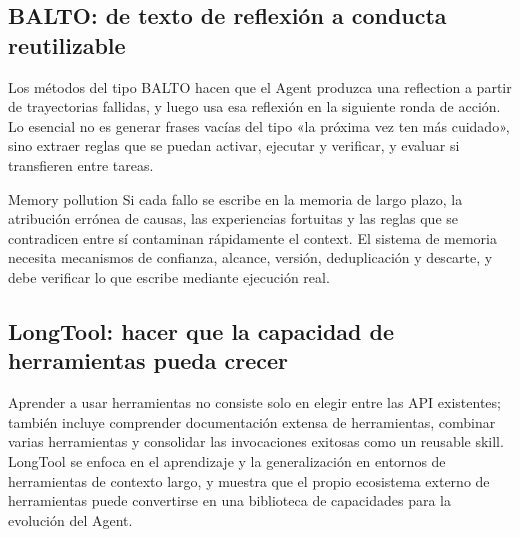 \subsection{BALTO: de texto de reflexión a conducta reutilizable}

Los métodos del tipo BALTO hacen que el Agent produzca una reflection a partir de trayectorias fallidas, y luego usa esa reflexión en la siguiente ronda de acción. Lo esencial no es generar frases vacías del tipo «la próxima vez ten más cuidado», sino extraer reglas que se puedan activar, ejecutar y verificar, y evaluar si transfieren entre tareas.



\begin{warningbox}{Memory pollution}
Si cada fallo se escribe en la memoria de largo plazo, la atribución errónea de causas, las experiencias fortuitas y las reglas que se contradicen entre sí contaminan rápidamente el context. El sistema de memoria necesita mecanismos de confianza, alcance, versión, deduplicación y descarte, y debe verificar lo que escribe mediante ejecución real.
\end{warningbox}

\subsection{LongTool: hacer que la capacidad de herramientas pueda crecer}

Aprender a usar herramientas no consiste solo en elegir entre las API existentes; también incluye comprender documentación extensa de herramientas, combinar varias herramientas y consolidar las invocaciones exitosas como un reusable skill. LongTool se enfoca en el aprendizaje y la generalización en entornos de herramientas de contexto largo, y muestra que el propio ecosistema externo de herramientas puede convertirse en una biblioteca de capacidades para la evolución del Agent.



